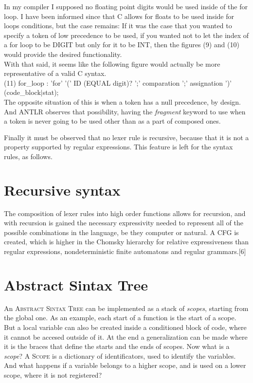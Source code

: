 \documentclass[twocolumn,10ptr]{article}
\begin{document}
In my compiler I supposed no floating point digits would be used inside of the for loop. I have been informed since that C allows for floats to be used inside for loops conditions, but the case remains:
If it was the case that you wanted to specify a token of low precedence to be used, if you wanted not to let the index of a for loop to be DIGIT but only for it to be INT, then the figures (9) and (10) would provide the desired functionality.\\

With that said, it seems like the following figure would actually be more representative of a valid C syntax.\\

(11) for\_loop :  'for' '(' ID (EQUAL digit)? ';' comparation ';' assignation ')' (code\_block\(\mid\)stat);\\

The opposite situation of this is when a token has a null precedence, by design. And ANTLR observes that possibility, having the \textit{fragment} keyword to use when a token is never going to be used other than as a part of composed ones.

Finally it must be observed that no lexer rule is recursive, because that it is not a property supported by regular expressions. This feature is left for the syntax rules, as follows.

\section{Recursive syntax}
The composition of lexer rules into high order functions allows for recursion, and with recursion is gained the necessary expressivity needed to represent all of the possible combinations  in the language, be they computer or natural. A CFG is created, which is higher in the Chomsky hierarchy for relative expressiveness than regular expressions, nondeterministic finite automatons and regular grammars.[6] 

\section{ Abstract Sintax Tree}
An \textsc{Abstract Sintax Tree} can be implemented as a stack of\textit{ scopes}, starting from the global one. As an example, each start of a function is the start of a scope. But a local variable can also be created inside a conditioned block of code, where it cannot be accesed outside of it. At the end a generalization can be made where it is the braces that define the starts and the ends of scopes.
Now what is a\textit{ scope}? A\textsc{ Scope} is a dictionary of identificators, used to identify the variables.
And what happens if a variable belongs to a higher scope, and is used on a lower scope, where it is not registered? 
\end{document}
